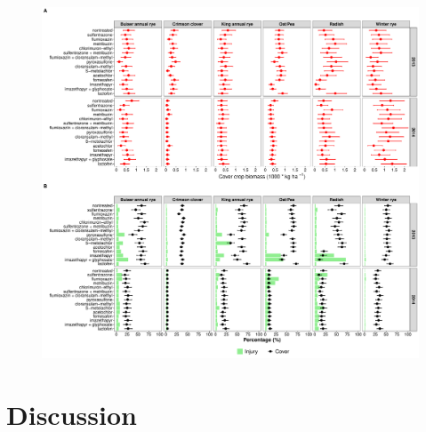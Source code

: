 \documentclass[agriculture,article,submit,moreauthors,pdftex]{mdpi}
\begin{document}
\begin{figure}[H]
\centering
\includegraphics[width=17 cm]{SoyF.pdf}
\caption{}
\end{figure}

\hypertarget{discussion}{%
\section{Discussion}\label{discussion}}
\end{document}
